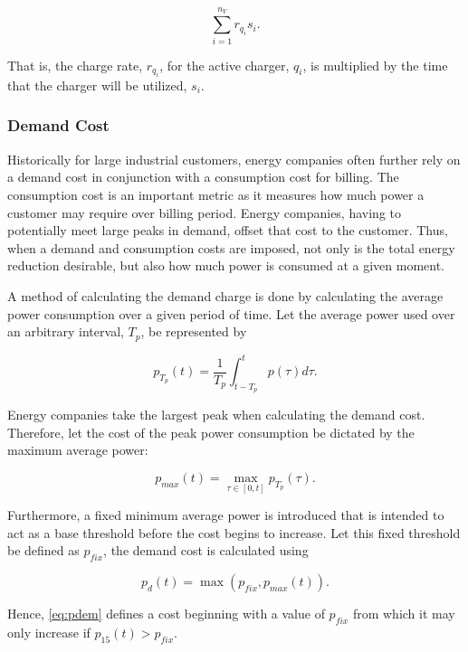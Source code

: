 \documentclass[energies,article,submit,moreauthors]{Definitions/mdpi}
\begin{document}
\begin{equation}
\label{eq:consumption-cost}
\sum_{i=1}^{n_V} r_{q_i}s_i\text{.}
\end{equation}

That is, the charge rate, \(r_{q_i}\), for the active charger, \(q_i\), is multiplied by the time that the charger will be
utilized, \(s_i\).

\subsubsection{Demand Cost}
\label{sec:demand-cost}
Historically for large industrial customers, energy companies often further rely on a demand cost in conjunction with a
consumption cost for billing. The consumption cost is an important metric as it measures how much power a customer may
require over billing period. Energy companies, having to potentially meet large peaks in demand, offset that cost to the
customer. Thus, when a demand and consumption costs are imposed, not only is the total energy reduction desirable, but
also how much power is consumed at a given moment.

A method of calculating the demand charge is done by calculating the average power consumption over a given period of
time. Let the average power used over an arbitrary interval, \(T_p\), be represented by

\begin{equation}
\label{eq:p}
p_{T_p}(t) = \frac{1}{T_p} \int_{t-T_p}^{t} p(\tau) d\tau\text{.}
\end{equation}

Energy companies take the largest peak when calculating the demand cost. Therefore, let the cost of the peak power
consumption be dictated by the maximum average power:

\begin{equation}
\label{eq:pmax}
p_{max}(t) = \max\limits_{\tau \in [0,t]}p_{T_p}(\tau)\text{.}
\end{equation}

Furthermore, a fixed minimum average power is introduced that is intended to act as a base threshold before the cost
begins to increase. Let this fixed threshold be defined as \(p_{fix}\), the demand cost is calculated using

\begin{equation}
\label{eq:pdem}
p_d(t) = \max(p_{fix},p_{max}(t))\text{.}
\end{equation}

Hence, \ref{eq:pdem} defines a cost beginning with a value of \(p_{fix}\) from which it may only increase if \(p_{15}(t) >
p_{fix}\).
\end{document}
